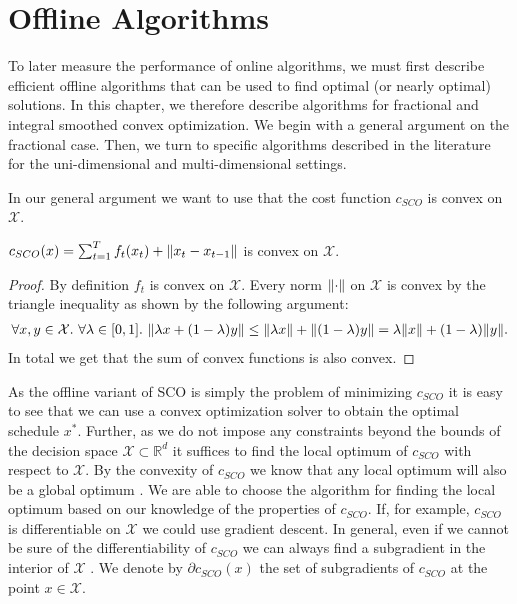 
\chapter{Offline Algorithms}\label{chapter:offline_algorithms}

To later measure the performance of online algorithms, we must first describe efficient offline algorithms that can be used to find optimal (or nearly optimal) solutions. In this chapter, we therefore describe algorithms for fractional and integral smoothed convex optimization. We begin with a general argument on the fractional case. Then, we turn to specific algorithms described in the literature for the uni-dimensional and multi-dimensional settings.

In our general argument we want to use that the cost function $c_{SCO}$ is convex on $\mathcal{X}$.

\begin{lemma}
$c_{SCO}(x) = \sum_{t=1}^T f_t(x_t) + \lVert x_t - x_{t-1}\rVert$ is convex on $\mathcal{X}$.
\end{lemma}
\begin{proof}
By definition $f_t$ is convex on $\mathcal{X}$. Every norm $\lVert\cdot\rVert$ on $\mathcal{X}$ is convex by the triangle inequality as shown by the following argument: \begin{align*}
    \forall x, y \in \mathcal{X}.\ \forall \lambda \in [0,1].\ \norm{\lambda x + (1 - \lambda) y} \leq \norm{\lambda x} + \norm{(1 - \lambda) y} = \lambda \norm{x} + (1 - \lambda) \norm{y}.
\end{align*} In total we get that the sum of convex functions is also convex.
\end{proof}

As the offline variant of SCO is simply the problem of minimizing $c_{SCO}$ it is easy to see that we can use a convex optimization solver to obtain the optimal schedule $x^*$. Further, as we do not impose any constraints beyond the bounds of the decision space $\mathcal{X} \subset \mathbb{R}^d$ it suffices to find the local optimum of $c_{SCO}$ with respect to $\mathcal{X}$. By the convexity of $c_{SCO}$ we know that any local optimum will also be a global optimum \cite{Bubeck2015}. We are able to choose the algorithm for finding the local optimum based on our knowledge of the properties of $c_{SCO}$. If, for example, $c_{SCO}$ is differentiable on $\mathcal{X}$ we could use gradient descent. In general, even if we cannot be sure of the differentiability of $c_{SCO}$ we can always find a subgradient in the interior of $\mathcal{X}$ \cite{Bubeck2015}. We denote by $\partial c_{SCO}(x)$ the set of subgradients of $c_{SCO}$ at the point $x \in \mathcal{X}$.

